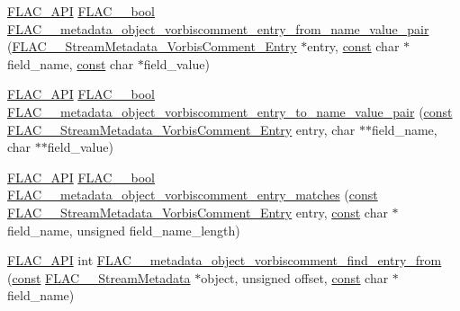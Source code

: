 \begin{DoxyCompactItemize}
\item 
\hyperlink{group__flac__export_ga56ca07df8a23310707732b1c0007d6f5}{F\+L\+A\+C\+\_\+\+A\+PI} \hyperlink{ordinals_8h_a95103469f1cbd78b8cf250194985b34e}{F\+L\+A\+C\+\_\+\+\_\+bool} \hyperlink{group__flac__metadata__object_ga0ec0c7ddd3a8832ee7a75bf47956b1c7}{F\+L\+A\+C\+\_\+\+\_\+metadata\+\_\+object\+\_\+vorbiscomment\+\_\+entry\+\_\+from\+\_\+name\+\_\+value\+\_\+pair} (\hyperlink{struct_f_l_a_c_____stream_metadata___vorbis_comment___entry}{F\+L\+A\+C\+\_\+\+\_\+\+Stream\+Metadata\+\_\+\+Vorbis\+Comment\+\_\+\+Entry} $\ast$entry, \hyperlink{zconf_8h_a2c212835823e3c54a8ab6d95c652660e}{const} char $\ast$field\+\_\+name, \hyperlink{zconf_8h_a2c212835823e3c54a8ab6d95c652660e}{const} char $\ast$field\+\_\+value)
\item 
\hyperlink{group__flac__export_ga56ca07df8a23310707732b1c0007d6f5}{F\+L\+A\+C\+\_\+\+A\+PI} \hyperlink{ordinals_8h_a95103469f1cbd78b8cf250194985b34e}{F\+L\+A\+C\+\_\+\+\_\+bool} \hyperlink{group__flac__metadata__object_gaca557b35c7c1ac19e30794bcf529746b}{F\+L\+A\+C\+\_\+\+\_\+metadata\+\_\+object\+\_\+vorbiscomment\+\_\+entry\+\_\+to\+\_\+name\+\_\+value\+\_\+pair} (\hyperlink{zconf_8h_a2c212835823e3c54a8ab6d95c652660e}{const} \hyperlink{struct_f_l_a_c_____stream_metadata___vorbis_comment___entry}{F\+L\+A\+C\+\_\+\+\_\+\+Stream\+Metadata\+\_\+\+Vorbis\+Comment\+\_\+\+Entry} entry, char $\ast$$\ast$field\+\_\+name, char $\ast$$\ast$field\+\_\+value)
\item 
\hyperlink{group__flac__export_ga56ca07df8a23310707732b1c0007d6f5}{F\+L\+A\+C\+\_\+\+A\+PI} \hyperlink{ordinals_8h_a95103469f1cbd78b8cf250194985b34e}{F\+L\+A\+C\+\_\+\+\_\+bool} \hyperlink{group__flac__metadata__object_gac31ee3de9f9931628f120cb611bb0f20}{F\+L\+A\+C\+\_\+\+\_\+metadata\+\_\+object\+\_\+vorbiscomment\+\_\+entry\+\_\+matches} (\hyperlink{zconf_8h_a2c212835823e3c54a8ab6d95c652660e}{const} \hyperlink{struct_f_l_a_c_____stream_metadata___vorbis_comment___entry}{F\+L\+A\+C\+\_\+\+\_\+\+Stream\+Metadata\+\_\+\+Vorbis\+Comment\+\_\+\+Entry} entry, \hyperlink{zconf_8h_a2c212835823e3c54a8ab6d95c652660e}{const} char $\ast$field\+\_\+name, unsigned field\+\_\+name\+\_\+length)
\item 
\hyperlink{group__flac__export_ga56ca07df8a23310707732b1c0007d6f5}{F\+L\+A\+C\+\_\+\+A\+PI} int \hyperlink{group__flac__metadata__object_gae094c1ce4f248d49e8c099661bd5288e}{F\+L\+A\+C\+\_\+\+\_\+metadata\+\_\+object\+\_\+vorbiscomment\+\_\+find\+\_\+entry\+\_\+from} (\hyperlink{zconf_8h_a2c212835823e3c54a8ab6d95c652660e}{const} \hyperlink{struct_f_l_a_c_____stream_metadata}{F\+L\+A\+C\+\_\+\+\_\+\+Stream\+Metadata} $\ast$object, unsigned offset, \hyperlink{zconf_8h_a2c212835823e3c54a8ab6d95c652660e}{const} char $\ast$field\+\_\+name)

\end{DoxyCompactItemize}
